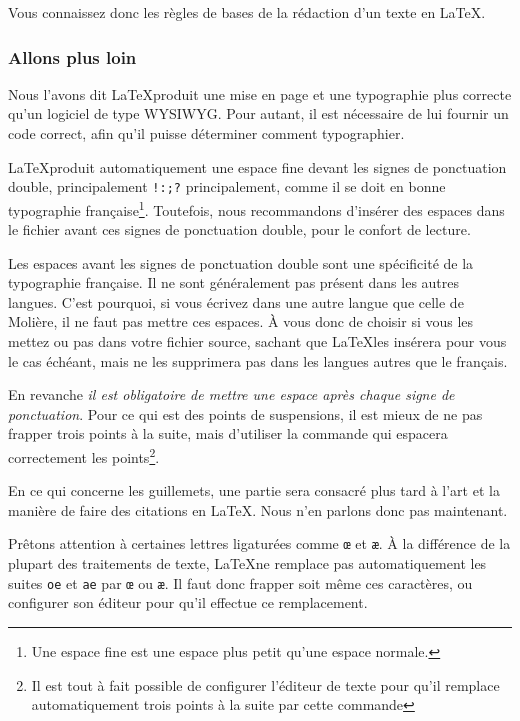 Vous connaissez donc les règles de bases de la rédaction d'un texte en \LaTeX.

\subsubsection{Allons plus loin}


Nous l'avons dit \LaTeX produit une mise en page et une typographie plus correcte qu'un logiciel de type WYSIWYG. Pour autant, il est nécessaire de lui fournir un code correct, afin qu'il puisse déterminer comment typographier.

\LaTeX produit automatiquement  une espace fine devant les signes de ponctuation double, principalement \verb|!:;?| principalement, comme il se doit en bonne typographie fran\c caise\footnote{Une espace fine est une espace plus petit qu'une espace normale.}. Toutefois, nous recommandons d'insérer des espaces dans le fichier  avant ces signes de ponctuation double, pour le confort de lecture.

\begin{attention}
Les espaces avant les signes de ponctuation double sont une spécificité de la typographie française. Il ne sont généralement pas présent dans les autres langues. C'est pourquoi, si vous écrivez dans une autre langue que celle de Molière, il ne faut pas mettre ces espaces. À vous donc de choisir si vous les mettez ou pas dans votre fichier source, sachant que \LaTeX les insérera pour vous le cas échéant, mais ne les supprimera pas dans les langues autres que le français.
\end{attention}
En revanche \emph{il est obligatoire de mettre une espace après chaque signe de ponctuation}. Pour ce qui est des points de suspensions, il est mieux de ne pas frapper trois points à la suite, mais d'utiliser la commande  qui espacera correctement les points\footnote{Il est tout à fait possible de configurer l'éditeur de texte pour qu'il remplace automatiquement trois points à la suite par cette commande}.

En ce qui concerne les guillemets, une partie sera consacré plus tard à l'art et la manière de faire des citations en \LaTeX. Nous n'en parlons donc pas maintenant.

Prêtons attention à certaines lettres ligaturées comme  \verb|œ| et  \verb|æ|. À la différence de la plupart des traitements de texte, \LaTeX ne remplace pas automatiquement les suites \verb|oe| et \verb|ae| par \verb|œ| ou \verb|æ|. Il faut donc frapper soit même ces caractères, ou configurer son éditeur pour qu'il effectue ce remplacement.

